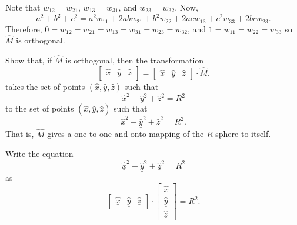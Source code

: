 \documentclass{ximera}
\begin{document}
\begin{problem}
\begin{freeResponse}
 Note that $w_{12} =  w_{21}$, $w_{13} =  w_{31}$, and $w_{23} =  w_{32}$. Now,
\[
 a^2 + b^2 +c^2 =  
a^2 w_{11} + 2abw_{21} + b^2 w_{22} + 2ac w_{13} + c^2 w_{33} + 2bc w_{23}.
\]
Therefore,  $0 = w_{12} =  w_{21} =w_{13} =  w_{31} = w_{23} =  w_{32}$, and $1 =  w_{11} =  w_{22} =  w_{33}$ so $\hat{M}$ is orthogonal. 
 
\end{freeResponse}

\end{problem}


\begin{problem}
  Show that, if $\hat{M}$ is orthogonal, then the transformation
  \[
  \begin{bmatrix}
    \underline{\hat{x}} & \underline{\hat{y}} & \underline{\hat{z}}
  \end{bmatrix}
  =
  \begin{bmatrix}
    \hat{x} & \hat{y} & \hat{z}
  \end{bmatrix}
  \cdot \hat{M}.
  \]
  takes the set of points $\left(\hat{x},\hat{y},\hat{z}\right)$ such
  that
\[
\hat{x}^2 + \hat{y}^2 + \hat{z}^2 = R^2
\]
to the set of points
$\left(\underline{\hat{x}},\underline{\hat{y}},\underline{\hat{z}}\right)$
such that
\[
\underline{\hat{x}}^2 + \underline{\hat{y}}^{2} + \underline{\hat{z}}^{2}=R^2.
\]
That is, $\hat{M}$ gives a one-to-one and onto mapping of the $R$-sphere to
itself.
\begin{hint}
  Write the equation
  \[
  \underline{\hat{x}}^2 + \underline{\hat{y}}^{2} + \underline{\hat{z}}^{2}=R^2
  \]
  as
  \[
  \begin{bmatrix}
    \underline{\hat{x}} & \underline{\hat{y}} & \underline{\hat{z}}%
  \end{bmatrix}  
  \cdot
  \begin{bmatrix}
    \underline{\hat{x}}\\
    \underline{\hat{y}}\\
    \underline{\hat{z}}
  \end{bmatrix}  =R^2.
  \]
\end{hint}


\end{problem}
\end{document}

